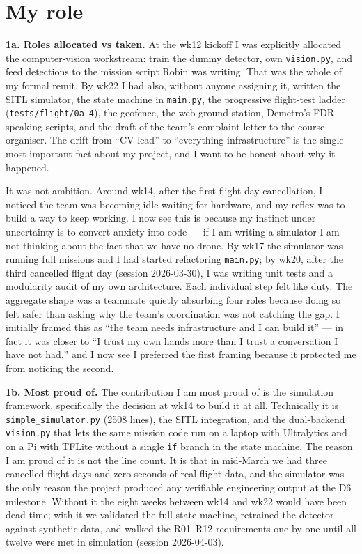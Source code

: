 \section{My role}

\textbf{1a. Roles allocated vs taken.} At the wk12 kickoff I was explicitly allocated the computer-vision workstream: train the dummy detector, own \texttt{vision.py}, and feed detections to the mission script Robin was writing. That was the whole of my formal remit. By wk22 I had also, without anyone assigning it, written the SITL simulator, the state machine in \texttt{main.py}, the progressive flight-test ladder (\texttt{tests/flight/0a}--\texttt{4}), the geofence, the web ground station, Demetro's FDR speaking scripts, and the draft of the team's complaint letter to the course organiser. The drift from ``CV lead'' to ``everything infrastructure'' is the single most important fact about my project, and I want to be honest about why it happened.

It was not ambition. Around wk14, after the first flight-day cancellation, I noticed the team was becoming idle waiting for hardware, and my reflex was to build a way to keep working. I now see this is because my instinct under uncertainty is to convert anxiety into code --- if I am writing a simulator I am not thinking about the fact that we have no drone. By wk17 the simulator was running full missions and I had started refactoring \texttt{main.py}; by wk20, after the third cancelled flight day (session 2026-03-30), I was writing unit tests and a modularity audit of my own architecture. Each individual step felt like duty. The aggregate shape was a teammate quietly absorbing four roles because doing so felt safer than asking why the team's coordination was not catching the gap. I initially framed this as ``the team needs infrastructure and I can build it'' --- in fact it was closer to ``I trust my own hands more than I trust a conversation I have not had,'' and I now see I preferred the first framing because it protected me from noticing the second.

\textbf{1b. Most proud of.} The contribution I am most proud of is the simulation framework, specifically the decision at wk14 to build it at all. Technically it is \texttt{simple\_simulator.py} (2508 lines), the SITL integration, and the dual-backend \texttt{vision.py} that lets the same mission code run on a laptop with Ultralytics and on a Pi with TFLite without a single \texttt{if} branch in the state machine. The reason I am proud of it is not the line count. It is that in mid-March we had three cancelled flight days and zero seconds of real flight data, and the simulator was the only reason the project produced any verifiable engineering output at the D6 milestone. Without it the eight weeks between wk14 and wk22 would have been dead time; with it we validated the full state machine, retrained the detector against synthetic data, and walked the R01--R12 requirements one by one until all twelve were met in simulation (session 2026-04-03).

